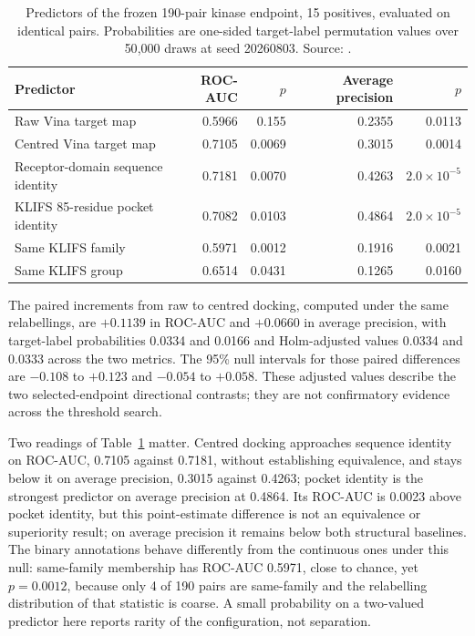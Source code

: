 \begin{table}[htbp]
\centering
\small
\setlength{\tabcolsep}{5pt}
\caption[Predictors of the frozen 190-pair kinase endpoint]{Predictors of the frozen 190-pair kinase endpoint, 15 positives, evaluated on identical
pairs. Probabilities are one-sided target-label permutation values over 50{,}000 draws at seed
20260803. Source: .}
\label{tab:s6-frozen-predictors}
\begin{tabular}{lrrrr}
\toprule
Predictor & ROC-AUC & $p$ & Average precision & $p$ \\
\midrule
Raw Vina target map            & 0.5966 & 0.155  & 0.2355 & 0.0113 \\
Centred Vina target map        & 0.7105 & 0.0069 & 0.3015 & 0.0014 \\
Receptor-domain sequence identity & 0.7181 & 0.0070 & 0.4263 & $2.0\times10^{-5}$ \\
KLIFS 85-residue pocket identity  & 0.7082 & 0.0103 & 0.4864 & $2.0\times10^{-5}$ \\
Same KLIFS family              & 0.5971 & 0.0012 & 0.1916 & 0.0021 \\
Same KLIFS group               & 0.6514 & 0.0431 & 0.1265 & 0.0160 \\
\bottomrule
\end{tabular}
\end{table}

The paired increments from raw to centred docking, computed under the same relabellings, are
$+0.1139$ in ROC-AUC and $+0.0660$ in average precision, with target-label probabilities 0.0334
and 0.0166 and Holm-adjusted values 0.0334 and 0.0333 across the two metrics. The 95\% null
intervals for those paired differences are $-0.108$ to $+0.123$ and $-0.054$ to $+0.058$.
These adjusted values describe the two selected-endpoint directional contrasts; they are not
confirmatory evidence across the threshold search.

Two readings of Table~\ref{tab:s6-frozen-predictors} matter. Centred docking approaches sequence
identity on ROC-AUC, 0.7105 against 0.7181, without establishing equivalence, and stays below it
on average precision, 0.3015 against 0.4263; pocket identity is the strongest predictor on average precision at 0.4864.
Its ROC-AUC is 0.0023 above pocket identity, but this point-estimate difference is not an
equivalence or superiority result; on average precision it remains below both structural
baselines. The binary annotations behave
differently from the continuous ones under this null: same-family membership has ROC-AUC 0.5971,
close to chance, yet $p=0.0012$, because only 4 of 190 pairs are same-family and the
relabelling distribution of that statistic is coarse. A small probability on a two-valued
predictor here reports rarity of the configuration, not separation.

